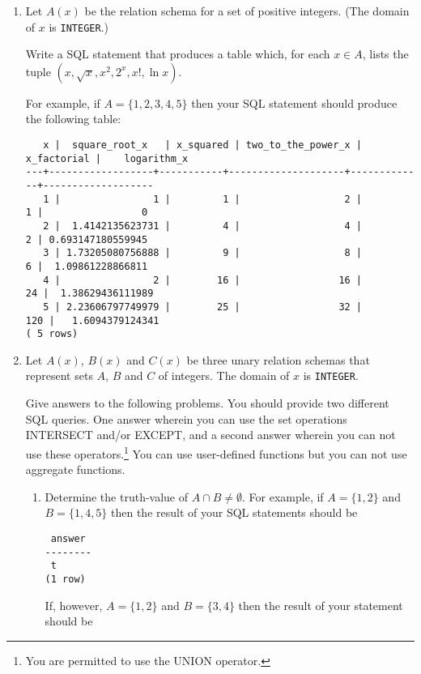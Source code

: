 \begin{enumerate}
 \item  Let $A(x)$ be the relation schema for a set of positive integers.
  (The domain of $x$ is {\tt INTEGER}.)
  
  Write a SQL statement that produces a table which,
  for each $x\in A$, lists the tuple $(x,\sqrt{x},x^2,2^x,x!,\ln x)$.

  For example, if $A=\{1,2,3,4,5\}$ then your SQL statement should
  produce the following table:
  
  {\small
  \begin{verbatim}
   x |  square_root_x   | x_squared | two_to_the_power_x | x_factorial |    logarithm_x    
---+------------------+-----------+--------------------+-------------+-------------------
   1 |                1 |         1 |                  2 |           1 |                 0
   2 |  1.4142135623731 |         4 |                  4 |           2 | 0.693147180559945
   3 | 1.73205080756888 |         9 |                  8 |           6 |  1.09861228866811
   4 |                2 |        16 |                 16 |          24 |  1.38629436111989
   5 | 2.23606797749979 |        25 |                 32 |         120 |   1.6094379124341
( 5 rows)
\end{verbatim}
}%


 \item\label{booleanQueries}  
 Let $A(x)$, $B(x)$ and $C(x)$ be three unary relation schemas that
  represent sets $A$, $B$ and $C$ of integers.    The domain of $x$ is {\tt INTEGER}.
  
  Give answers to the following problems.
  You should provide two different SQL queries.   One answer
  wherein you can use the set operations INTERSECT and/or EXCEPT, and a second
  answer wherein you can not use these operators.\footnote{You are permitted to use the UNION operator.}
  You can use user-defined functions but you can not use aggregate functions.
\begin{enumerate}
 \item  Determine the truth-value of $A\cap B\neq \emptyset$.
For example, if $A=\{1,2\}$ and $B=\{1,4,5\}$ then the result of your SQL statements should be

\begin{verbatim}
 answer 
--------
 t
(1 row)
\end{verbatim}

If, however, $A=\{1,2\}$ and $B=\{3,4\}$ then the result of your statement should be


\end{enumerate}
\end{enumerate}
